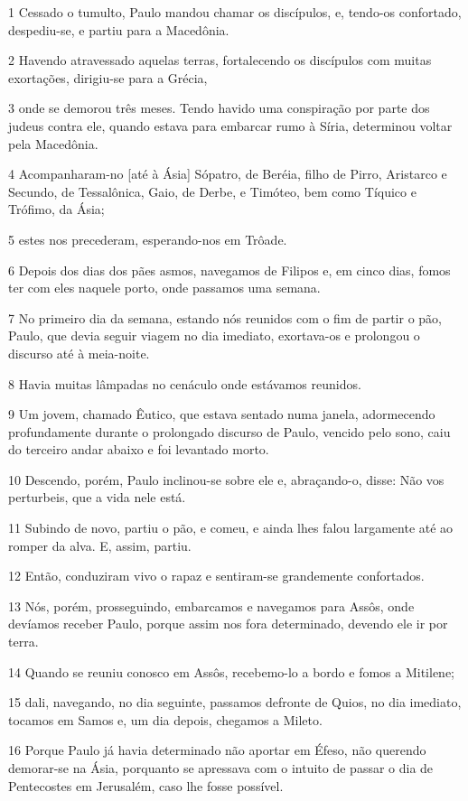 \par 1 Cessado o tumulto, Paulo mandou chamar os discípulos, e, tendo-os confortado, despediu-se, e partiu para a Macedônia.
\par 2 Havendo atravessado aquelas terras, fortalecendo os discípulos com muitas exortações, dirigiu-se para a Grécia,
\par 3 onde se demorou três meses. Tendo havido uma conspiração por parte dos judeus contra ele, quando estava para embarcar rumo à Síria, determinou voltar pela Macedônia.
\par 4 Acompanharam-no [até à Ásia] Sópatro, de Beréia, filho de Pirro, Aristarco e Secundo, de Tessalônica, Gaio, de Derbe, e Timóteo, bem como Tíquico e Trófimo, da Ásia;
\par 5 estes nos precederam, esperando-nos em Trôade.
\par 6 Depois dos dias dos pães asmos, navegamos de Filipos e, em cinco dias, fomos ter com eles naquele porto, onde passamos uma semana.
\par 7 No primeiro dia da semana, estando nós reunidos com o fim de partir o pão, Paulo, que devia seguir viagem no dia imediato, exortava-os e prolongou o discurso até à meia-noite.
\par 8 Havia muitas lâmpadas no cenáculo onde estávamos reunidos.
\par 9 Um jovem, chamado Êutico, que estava sentado numa janela, adormecendo profundamente durante o prolongado discurso de Paulo, vencido pelo sono, caiu do terceiro andar abaixo e foi levantado morto.
\par 10 Descendo, porém, Paulo inclinou-se sobre ele e, abraçando-o, disse: Não vos perturbeis, que a vida nele está.
\par 11 Subindo de novo, partiu o pão, e comeu, e ainda lhes falou largamente até ao romper da alva. E, assim, partiu.
\par 12 Então, conduziram vivo o rapaz e sentiram-se grandemente confortados.
\par 13 Nós, porém, prosseguindo, embarcamos e navegamos para Assôs, onde devíamos receber Paulo, porque assim nos fora determinado, devendo ele ir por terra.
\par 14 Quando se reuniu conosco em Assôs, recebemo-lo a bordo e fomos a Mitilene;
\par 15 dali, navegando, no dia seguinte, passamos defronte de Quios, no dia imediato, tocamos em Samos e, um dia depois, chegamos a Mileto.
\par 16 Porque Paulo já havia determinado não aportar em Éfeso, não querendo demorar-se na Ásia, porquanto se apressava com o intuito de passar o dia de Pentecostes em Jerusalém, caso lhe fosse possível.
